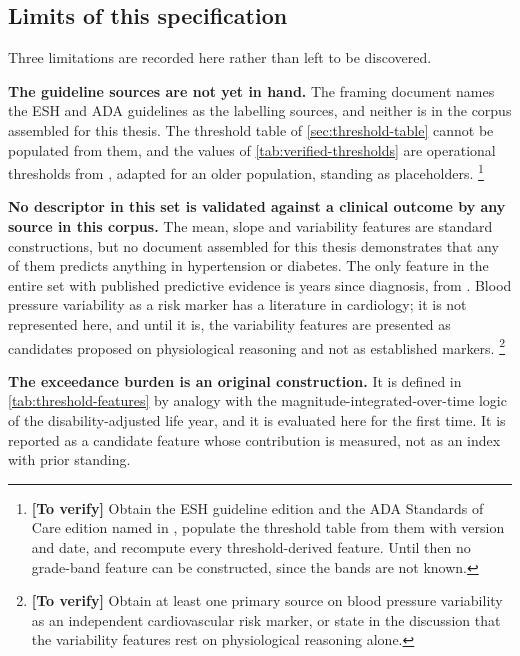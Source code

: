 \documentclass[12pt,a4paper,oneside]{report}
\newcommand{\verify}[1]{\footnote{\textbf{[To verify]} #1}}
\begin{document}
\subsection{Limits of this specification}\label{sec:feature-limits}

Three limitations are recorded here rather than left to be discovered.

\textbf{The guideline sources are not yet in hand.} The framing document names the ESH and ADA guidelines as the labelling sources, and neither is in the corpus assembled for this thesis. The threshold table of \cref{sec:threshold-table} cannot be populated from them, and the values of \cref{tab:verified-thresholds} are operational thresholds from \textcite{mihevc2025}, adapted for an older population, standing as placeholders.%
\verify{Obtain the ESH guideline edition and the ADA Standards of Care edition named in \textcite{cadrage2026}, populate the threshold table from them with version and date, and recompute every threshold-derived feature. Until then no grade-band feature can be constructed, since the bands are not known.}

\textbf{No descriptor in this set is validated against a clinical outcome by any source in this corpus.} The mean, slope and variability features are standard constructions, but no document assembled for this thesis demonstrates that any of them predicts anything in hypertension or diabetes. The only feature in the entire set with published predictive evidence is years since diagnosis, from \textcite{mendoza2025}. Blood pressure variability as a risk marker has a literature in cardiology; it is not represented here, and until it is, the variability features are presented as candidates proposed on physiological reasoning and not as established markers.%
\verify{Obtain at least one primary source on blood pressure variability as an independent cardiovascular risk marker, or state in the discussion that the variability features rest on physiological reasoning alone.}

\textbf{The exceedance burden is an original construction.} It is defined in \cref{tab:threshold-features} by analogy with the magnitude-integrated-over-time logic of the disability-adjusted life year, and it is evaluated here for the first time. It is reported as a candidate feature whose contribution is measured, not as an index with prior standing.

\end{document}
